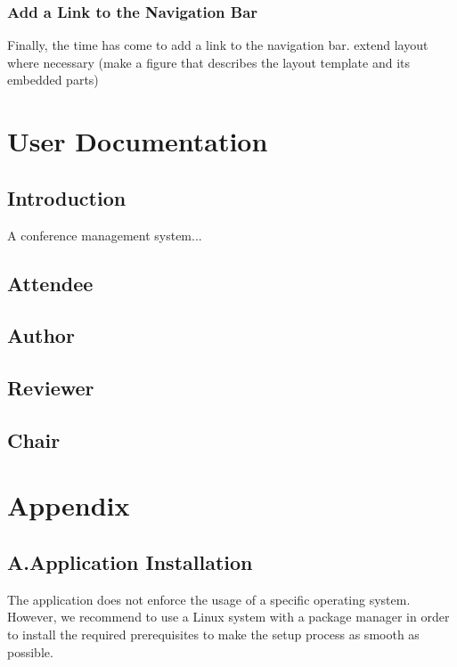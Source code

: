 \documentclass[nochapterpage,nopartpage,noheadingspace,numbersubsubsec,bigchapter,colorback,accentcolor=tud9c,10pt]{tudreport}
\begin{document}
  \section{Add a Link to the Navigation Bar}
  \label{sec:tech:handson:navlink}

    Finally, the time has come to add a link to the navigation bar.
    extend layout where necessary (make a figure that describes the layout template and its embedded parts)

\part{User Documentation}
\label{part:user}

  \chapter{Introduction}
  \label{ch:user:intro}

    A conference management system...

  \chapter{Attendee}
  \chapter{Author}
  \chapter{Reviewer}
  \chapter{Chair}



\part{Appendix}
\label{part:appendix}

  \chapter*{A.\quad Application Installation}
  \label{ch:appendix:setup}

    The application does not enforce the usage of a specific operating system. However, we recommend to use a Linux system with a package manager in order to install the required prerequisites to make the setup process as smooth as possible.
\end{document}
